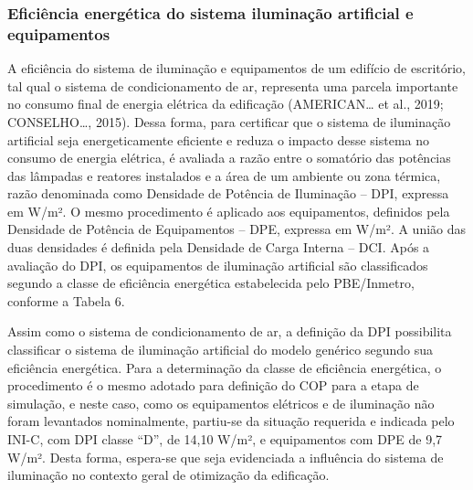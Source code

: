\subsubsection{Eficiência energética do sistema iluminação artificial e equipamentos}
A eficiência do sistema de iluminação e equipamentos de um edifício de escritório, tal 
qual o sistema de condicionamento de ar, representa uma parcela importante no consumo 
final de energia elétrica da edificação (AMERICAN… et al., 2019; CONSELHO…, 2015).\vspace*{0.3cm} \newline
Dessa forma, para certificar que o sistema de iluminação artificial seja energeticamente 
eficiente e reduza o impacto desse sistema no consumo de energia elétrica, é avaliada a 
razão entre o somatório das potências das lâmpadas e reatores instalados e a área de um 
ambiente ou zona térmica, razão denominada como Densidade de Potência de Iluminação – DPI, 
expressa em W/m². O mesmo procedimento é aplicado aos equipamentos, definidos pela Densidade 
de Potência de Equipamentos – DPE, expressa em W/m². A união das duas densidades é definida 
pela Densidade de Carga Interna – DCI.\vspace*{0.3cm} \newline
Após a avaliação do DPI, os equipamentos de iluminação artificial são classificados 
segundo a classe de eficiência energética estabelecida pelo PBE/Inmetro, conforme a Tabela 6.

Assim como o sistema de condicionamento de ar, a definição da DPI possibilita classificar o 
sistema de iluminação artificial do modelo genérico segundo sua eficiência energética. 
Para a determinação da classe de eficiência energética, o procedimento é o mesmo adotado 
para definição do COP para a etapa de simulação, e neste caso, como os equipamentos 
elétricos e de iluminação não foram levantados nominalmente, partiu-se da situação requerida 
e indicada pelo INI-C, com DPI classe “D”, de 14,10 W/m², e equipamentos com DPE de 9,7 W/m². 
Desta forma, espera-se que seja evidenciada a influência do sistema de iluminação no 
contexto geral de otimização da edificação.

